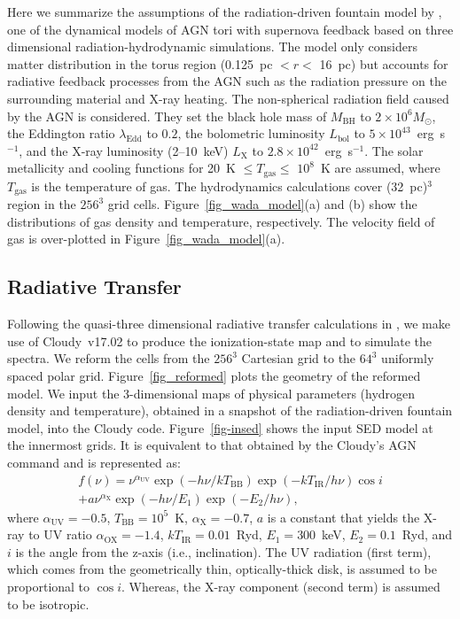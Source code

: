\documentclass[twocolumn,times,twocolappendix]{aastex63}
\begin{document}
Here we summarize the assumptions of the radiation-driven fountain
model by \citet{Wada2016}, one of the dynamical models of AGN tori
with supernova feedback based on three dimensional radiation-hydrodynamic
simulations.
The model only considers matter distribution in the torus region (0.125~pc $< r <$ 16~pc)
but accounts for
radiative feedback processes from the AGN such as the radiation
pressure on the surrounding material and X-ray heating.
The non-spherical radiation field caused by the AGN is considered.
They set the black hole mass of $M_\mathrm{BH}$ to $2 \times 10^6
M_\odot$,
the Eddington ratio $\lambda_\mathrm{Edd}$ to $0.2$, the bolometric
luminosity $L_\mathrm{bol}$ to $5 \times 10^{43}$~erg~s$^{-1}$, and the X-ray
luminosity (2--10~keV) $L_\mathrm{X}$ to $2.8 \times
10^{42}$~erg~s$^{-1}$.
The solar metallicity and cooling functions for 20~K $\leq T_\mathrm{gas} \leq$ $10^8$~K \citep{Meijerink2005,Wada2009} are assumed, where $T_\mathrm{gas}$ is the temperature of gas. 
The hydrodynamics calculations cover (32~pc)$^3$ region in the $256^3$
grid cells. Figure~\ref{fig_wada_model}(a) and (b) show the
distributions of gas density and temperature, respectively.  The
velocity field of gas is over-plotted in
Figure~\ref{fig_wada_model}(a).



\subsection{Radiative Transfer}

Following the quasi-three dimensional radiative transfer calculations
in \citet{Wada2018b}, we make use of \textsf{Cloudy}~v17.02 \citep{Ferland2017} to produce the ionization-state map and to simulate the spectra. 
We reform the cells from the $256^3$ Cartesian grid to the $64^3$ uniformly
spaced polar grid.
Figure~\ref{fig_reformed} plots the geometry of the reformed model.
We input the 3-dimensional maps of physical 
parameters (hydrogen density and temperature), obtained 
in a snapshot of the radiation-driven fountain model, into the
\textsf{Cloudy} code. Figure~\ref{fig-insed} shows the input SED
model at the innermost grids. It is equivalent to that 
obtained by the \textsf{Cloudy}'s \textsf{AGN} command and is represented as:
\begin{eqnarray}
\label{eqn:agncon}
f \left(\nu\right)    =  \nu ^{\alpha _\mathrm{UV} } \exp \left( { - h\nu /kT_\mathrm{BB} } \right)\exp \left( { - kT_\mathrm{IR} /h\nu } \right)\cos{i} \nonumber\\
                         +  a\nu ^{\alpha_\mathrm{X} } \exp \left( { - h\nu /E_1 } \right) \exp \left( { - E_2 /h\nu } \right),
\end{eqnarray}
where 
$\alpha _\mathrm{UV} = -0.5$, $T_\mathrm{BB} = 10^5$~K, 
$\alpha_\mathrm{X} = -0.7$, $a$ is a constant that yields the X-ray to UV ratio $\alpha_\mathrm{OX} = -1.4$, $kT_\mathrm{IR} = 0.01$~Ryd,
$E_\mathrm{1} = 300$~keV, $E_\mathrm{2} = 0.1$~Ryd, and $i$ is the angle from the z-axis (i.e., inclination). 
The UV radiation (first term), which comes from the geometrically
thin, optically-thick disk, 
is assumed to be proportional to $\cos{i}$. 
Whereas, the X-ray component (second term) is assumed to be isotropic.
\end{document}
